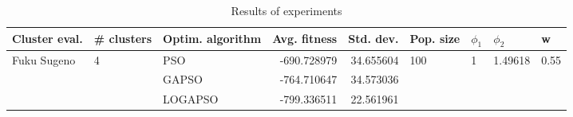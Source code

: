 \begin{table}
\centering
\caption{Results of experiments}
\begin{tabular}{lllrrllll}
\toprule
               Cluster eval. &        \# clusters & Optim. algorithm &  Avg. fitness &  Std. dev. &            Pop. size &         $\phi_{1}$ &               $\phi_{2}$ &                     w \\
\midrule
\multirow{3}{*}{Fuku Sugeno} & \multirow{3}{*}{4} &              PSO &   -690.728979 &  34.655604 & \multirow{3}{*}{100} & \multirow{3}{*}{1} & \multirow{3}{*}{1.49618} & \multirow{3}{*}{0.55} \\
                             &                    &            GAPSO &   -764.710647 &  34.573036 &                      &                    &                          &                       \\
                             &                    &          LOGAPSO &   -799.336511 &  22.561961 &                      &                    &                          &                       \\
\bottomrule
\end{tabular}
\end{table}
